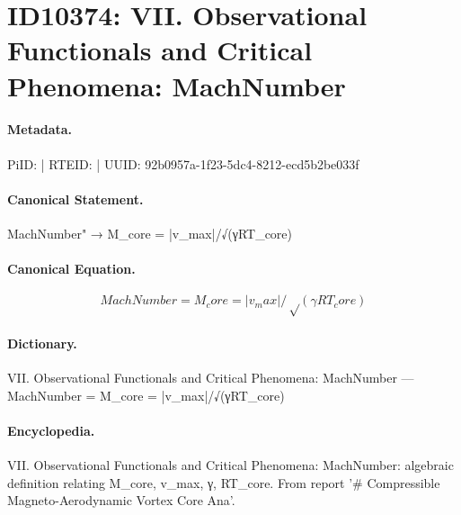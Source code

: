 \section*{ID10374: VII. Observational Functionals and Critical Phenomena: MachNumber}
\paragraph{Metadata.}
PiID:  | RTEID:  | UUID: 92b0957a-1f23-5dc4-8212-ecd5b2be033f

\paragraph{Canonical Statement.}
MachNumber" → M\_core = |v\_max|/√(γRT\_core)

\paragraph{Canonical Equation.}
\[
MachNumber = M_core = |v_max|/√(γRT_core)
\]

\paragraph{Dictionary.}
VII. Observational Functionals and Critical Phenomena: MachNumber — MachNumber = M\_core = |v\_max|/√(γRT\_core)

\paragraph{Encyclopedia.}
VII. Observational Functionals and Critical Phenomena: MachNumber: algebraic definition relating M\_core, v\_max, γ, RT\_core. From report '\# Compressible Magneto-Aerodynamic Vortex Core Ana'.
